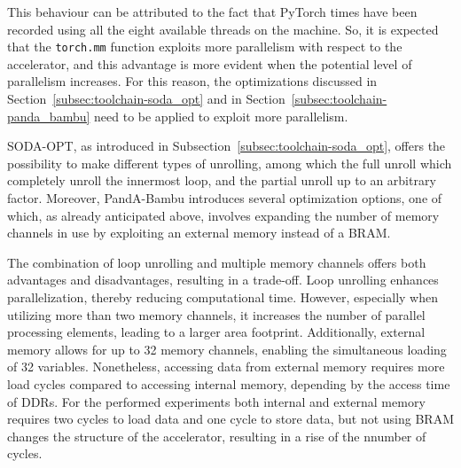 This behaviour can be attributed to the fact that PyTorch times have been recorded using all the eight available threads on the machine.
So, it is expected that the \lstinline{torch.mm} function exploits more parallelism with respect to the accelerator, and this advantage is more evident when the potential level of parallelism increases.
For this reason, the optimizations discussed in Section~\ref{subsec:toolchain-soda_opt} and in Section~\ref{subsec:toolchain-panda_bambu} need to be applied to exploit more parallelism.

SODA-OPT, as introduced in Subsection~\ref{subsec:toolchain-soda_opt}, offers the possibility to make different types of unrolling, among which the full unroll which completely unroll the innermost loop, and the partial unroll up to an arbitrary factor.
Moreover, PandA-Bambu introduces several optimization options, one of which, as already anticipated above, involves expanding the number of memory channels in use by exploiting an external memory instead of a BRAM\@.

The combination of loop unrolling and multiple memory channels offers both advantages and disadvantages, resulting in a trade-off.
Loop unrolling enhances parallelization, thereby reducing computational time.
However, especially when utilizing more than two memory channels, it increases the number of parallel processing elements, leading to a larger area footprint.
Additionally, external memory allows for up to 32 memory channels, enabling the simultaneous loading of 32 variables.
Nonetheless, accessing data from external memory requires more load cycles compared to accessing internal memory, depending by the access time of DDRs.
For the performed experiments both internal and external memory requires two cycles to load data and one cycle to store data, but not using BRAM changes the structure of the accelerator, resulting in a rise of the nnumber of cycles.

